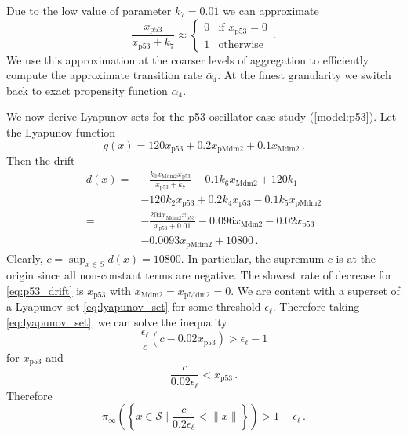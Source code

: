 Due to the low value of parameter $k_7=0.01$ we can approximate
\[\frac{x_{\mathrm{p53}}}{x_{\mathrm{p53}} + k_7}
\approx
\begin{cases}
0 & \text{if } x_{\mathrm{p53}} = 0\\
1 & \text{otherwise}
\end{cases}\,.
\]
We use this approximation at the coarser levels of aggregation to efficiently compute the approximate transition rate $\bar{\alpha}_4$.
At the finest granularity we switch back to exact propensity function $\alpha_4$.

We now derive Lyapunov-sets for the p53 oscillator case study (\autoref{model:p53}). Let the Lyapunov function
\begin{equation}
    g(x) = 120 x_{\mathrm{p53}} + 0.2 x_{\mathrm{pMdm2}} + 0.1 x_{\mathrm{Mdm2}}\,.
\end{equation}
Then the drift
\begin{equation}\label{eq:p53_drift}
\begin{split}
    d(x) = & - \frac{k_3 x_{\mathrm{Mdm2}} x_{\mathrm{p53}}}{x_{\mathrm{p53}} + k_7}
            - 0.1 k_6 x_{\mathrm{Mdm2}}
            + 120 k_1 \\
          & - 120 k_2 x_{\mathrm{p53}}
            + 0.2 k_4 x_{\mathrm{p53}}
            - 0.1 k_5 x_{\mathrm{pMdm2}}  \\
        = & - \frac{204 x_{\mathrm{Mdm2}} x_{\mathrm{p53}}}{x_{\mathrm{p53}} + 0.01}
            - 0.096 x_{\mathrm{Mdm2}}
            - 0.02 x_{\mathrm{p53}} \\
            &- 0.0093 x_{\mathrm{pMdm2}}
	    + \num{10800}\,. 
\end{split}
\end{equation}
Clearly, $c = \sup_{x\in{S}} d(x) = \num{10800}$.
In particular, the supremum $c$ is at the origin since all non-constant terms are negative.
The slowest rate of decrease for \eqref{eq:p53_drift} is $x_{\mathrm{p53}}$ with $x_{\mathrm{Mdm2}} = x_{\mathrm{pMdm2}} = 0$.
We are content with a superset of a Lyapunov set \eqref{eq:lyapunov_set} for some threshold $\epsilon_{\ell}$.
Therefore taking \eqref{eq:lyapunov_set}, we can solve the inequality
\[
	\frac{\epsilon_{\ell}}{c}(c - \num{0.02} x_{\mathrm{p53}}) > \epsilon_{\ell} - 1
\]
for $x_{\mathrm{p53}}$ and 
\begin{equation*}
    \frac{c}{0.02 \epsilon_{\ell}} < x_{\mathrm{p53}}\,.
\end{equation*}
Therefore
\begin{equation*}
\pi_{\infty}\left(\left\{x\in\mathcal{S} \mid \frac{c}{0.2\epsilon_{\ell}} < \lVert x \rVert \right\}\right) > 1 - \epsilon_{\ell}\,.
\end{equation*}

